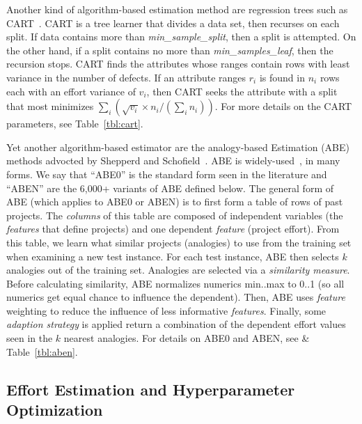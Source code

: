 

Another kind of algorithm-based estimation method are regression trees such as   CART~\cite{brieman84}.  
CART is a  tree learner that divides a data set, then recurses
on each split.
If data contains more than {\em min\_sample\_split}, then a split is attempted.
On the other hand, if a split contains no more than {\em min\_samples\_leaf}, then the recursion stops. 
CART finds the attributes whose ranges contain rows with least variance in the number
of defects. If an  attribute ranges $r_i$ is found in 
$n_i$ rows each with an effort  variance of $v_i$, then CART seeks the  attribute with a split that most
minimizes $\sum_i \left(\sqrt{v_i}\times n_i/(\sum_i n_i)\right)$.
For more details on the CART parameters, see Table~\ref{tbl:cart}.


Yet another algorithm-based estimator are the 
analogy-based Estimation (ABE) methods advocted by Shepperd and Schofield~\cite{shepperd1997estimating}. ABE is widely-used~\cite{7194627,Kocaguneli2015,7426628,6092574,MenziesNeg:2017}, in many forms.
We  say that  ``ABE0'' is the standard  form  seen in the literature
and ``ABEN'' are the 6,000+ variants of ABE  defined below. 
The general form of ABE (which applies to  ABE0 or ABEN) is
to first form a table of rows of past projects. The {\em columns} of this table are composed of independent variables (the {\em features} that define projects) and one dependent {\em feature} (project  effort).
From this table, we learn  what  similar projects (analogies) to use from the training set when examining a new test instance.
For each test instance, ABE then selects   $k$ analogies out of the training set.
Analogies are selected via   a {\em similarity measure}. 
Before calculating similarity,  ABE normalizes   numerics  min..max to 0..1 (so all numerics   get equal chance to influence the dependent). 
Then, ABE uses {\em feature} weighting to reduce the influence of less informative {\em features}.
Finally, some  {\em adaption strategy} is applied  return a combination of  the dependent effort values seen in  the $k$ nearest analogies. For  details on ABE0 and ABEN, see  \& Table~\ref{tbl:aben}. 





\subsection{Effort Estimation and  Hyperparameter Optimization}
\label{sec:4}

